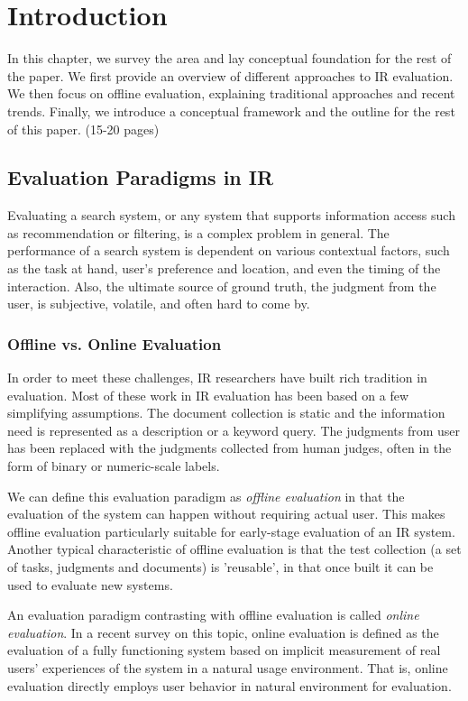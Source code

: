 \documentclass[openany]{now} %
\begin{document}
\chapter{Introduction}
\label{c-intro}

In this chapter, we survey the area and lay conceptual foundation for the rest of the paper. We first provide an overview of different approaches to IR evaluation. We then focus on offline evaluation, explaining traditional approaches and recent trends. Finally, we introduce a conceptual framework and the outline for the rest of this paper. (15-20 pages)

\section{Evaluation Paradigms in IR}

Evaluating a search system, or any system that supports information access such as recommendation or filtering, is a complex problem in general. The performance of a search system is dependent on various contextual factors, such as the task at hand, user's preference and location, and even the timing of the interaction. Also, the ultimate source of ground truth, the judgment from the user, is subjective, volatile, and often hard to come by.

\subsection{Offline vs. Online Evaluation}

In order to meet these challenges, IR researchers have built rich tradition in evaluation. Most of these work in IR evaluation has been based on a few simplifying assumptions. The document collection is static and the information need is represented as a description or a keyword query. The judgments from user has been replaced with the judgments collected from human judges, often in the form of binary or numeric-scale labels.

We can define this evaluation paradigm as \textit{offline evaluation} \cite{INR-009} in that the evaluation of the system can happen without requiring actual user. This makes offline evaluation particularly suitable for early-stage evaluation of an IR system. Another typical characteristic of offline evaluation is that the test collection (a set of tasks, judgments and documents) is 'reusable', in that once built it can be used to evaluate new systems.

An evaluation paradigm contrasting with offline evaluation is called \textit{online evaluation}. In a recent survey \cite{INR-XYZ} on this topic, online evaluation is defined as the evaluation of a fully functioning system based on implicit measurement of real users' experiences of the system in a natural usage environment. That is, online evaluation directly employs user behavior in natural environment for evaluation.
\end{document}
